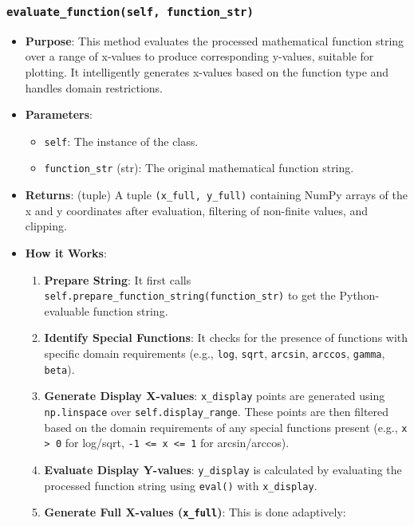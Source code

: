 \documentclass[12pt,a4paper]{report}
\begin{document}
\subsubsection{\texttt{evaluate\_function(self, function\_str)}}
\begin{itemize}
    \item \textbf{Purpose}: This method evaluates the processed mathematical function string over a range of x-values to produce corresponding y-values, suitable for plotting. It intelligently generates x-values based on the function type and handles domain restrictions.
    \item \textbf{Parameters}:
        \begin{itemize}
            \item \texttt{self}: The instance of the class.
            \item \texttt{function\_str} (str): The original mathematical function string.
        \end{itemize}
    \item \textbf{Returns}: (tuple) A tuple \texttt{(x\_full, y\_full)} containing NumPy arrays of the x and y coordinates after evaluation, filtering of non-finite values, and clipping.
    \item \textbf{How it Works}:
        \begin{enumerate}
            \item \textbf{Prepare String}: It first calls \texttt{self.prepare\_function\_string(function\_str)} to get the Python-evaluable function string.
            \item \textbf{Identify Special Functions}: It checks for the presence of functions with specific domain requirements (e.g., \texttt{log}, \texttt{sqrt}, \texttt{arcsin}, \texttt{arccos}, \texttt{gamma}, \texttt{beta}).
            \item \textbf{Generate Display X-values}: \texttt{x\_display} points are generated using \texttt{np.linspace} over \texttt{self.display\_range}. These points are then filtered based on the domain requirements of any special functions present (e.g., \texttt{x > 0} for log/sqrt, \texttt{-1 <= x <= 1} for arcsin/arccos).
            \item \textbf{Evaluate Display Y-values}: \texttt{y\_display} is calculated by evaluating the processed function string using \texttt{eval()} with \texttt{x\_display}.
            \item \textbf{Generate Full X-values (\texttt{x\_full})}: This is done adaptively:
                \begin{itemize}

\end{itemize}
\end{enumerate}
\end{itemize}
\end{document}
